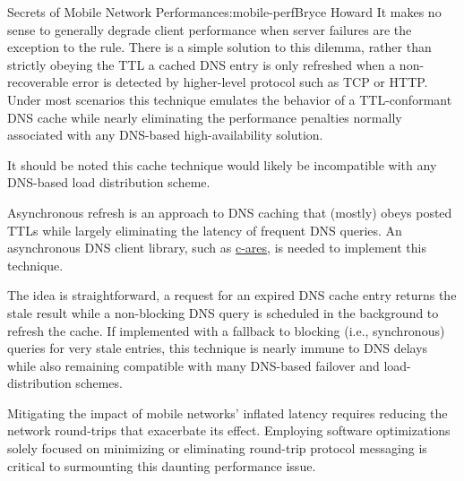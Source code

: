 \begin{aosachapter}{Secrets of Mobile Network Performance}{s:mobile-perf}{Bryce Howard}
It makes no sense to generally degrade client performance when server
failures are the exception to the rule. There is a simple solution to
this dilemma, rather than strictly obeying the TTL a cached DNS entry is
only refreshed when a non-recoverable error is detected by higher-level
protocol such as TCP or HTTP. Under most scenarios this technique
emulates the behavior of a TTL-conformant DNS cache while nearly
eliminating the performance penalties normally associated with any
DNS-based high-availability solution.

It should be noted this cache technique would likely be incompatible
with any DNS-based load distribution scheme.


Asynchronous refresh is an approach to DNS caching that (mostly) obeys
posted TTLs while largely eliminating the latency of frequent DNS
queries. An asynchronous DNS client library, such as
\href{http://c-ares.haxx.se/}{c-ares}, is needed to implement this
technique.

The idea is straightforward, a request for an expired DNS cache entry
returns the stale result while a non-blocking DNS query is scheduled in
the background to refresh the cache. If implemented with a fallback to
blocking (i.e., synchronous) queries for very stale entries, this
technique is nearly immune to DNS delays while also remaining compatible
with many DNS-based failover and load-distribution schemes.


Mitigating the impact of mobile networks' inflated latency requires
reducing the network round-trips that exacerbate its effect. Employing
software optimizations solely focused on minimizing or eliminating
round-trip protocol messaging is critical to surmounting this daunting
performance issue.

\end{aosachapter}
